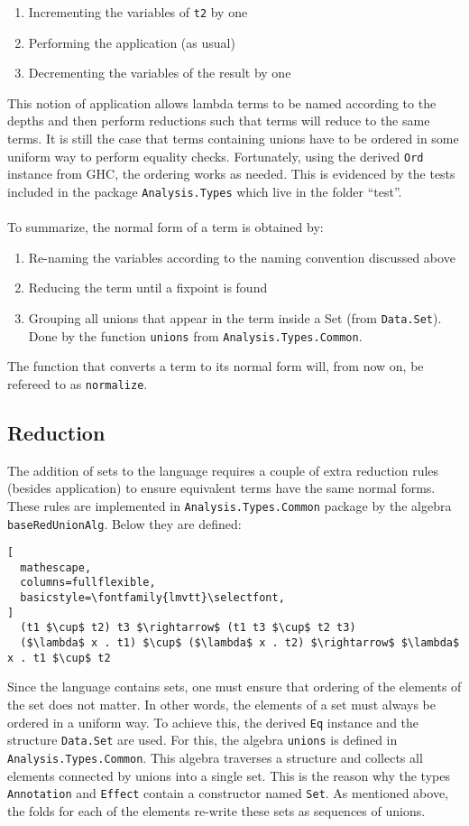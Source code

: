 \documentclass[8pt]{extarticle}
\begin{document}
\begin{enumerate}
\item Incrementing the variables of \verb+t2+ by one
\item Performing the application (as usual)
\item Decrementing the variables of the result by one
\end{enumerate}
This notion of application allows lambda terms to be named according to the depths and then perform reductions such that terms will reduce to the same terms. It is still the case that terms containing unions have to be ordered in some uniform way to perform equality checks. Fortunately, using the derived \verb+Ord+ instance from GHC, the ordering works as needed. This is evidenced by the tests included in the package \verb+Analysis.Types+ which live in the folder ``test''.
\\\\
To summarize, the normal form of a term is obtained by:
\begin{enumerate}
\item Re-naming the variables according to the naming convention discussed above
\item Reducing the term until a fixpoint is found
\item Grouping all unions that appear in the term inside a Set (from \verb+Data.Set+). Done by the function \verb+unions+ from \verb+Analysis.Types.Common+.
\end{enumerate}
The function that converts a term to its normal form will, from now on, be refereed to as \verb+normalize+.
\subsection{Reduction}
The addition of sets to the language requires a couple of extra reduction rules (besides application) to ensure equivalent terms have the same normal forms. These rules are implemented in \verb+Analysis.Types.Common+ package by the algebra \verb+baseRedUnionAlg+. Below they are defined:
\begin{lstlisting}[
  mathescape,
  columns=fullflexible,
  basicstyle=\fontfamily{lmvtt}\selectfont,
]
  (t1 $\cup$ t2) t3 $\rightarrow$ (t1 t3 $\cup$ t2 t3)
  ($\lambda$ x . t1) $\cup$ ($\lambda$ x . t2) $\rightarrow$ $\lambda$ x . t1 $\cup$ t2
\end{lstlisting}
Since the language contains sets, one must ensure that ordering of the elements of the set does not matter. In other words, the elements of a set must always be ordered in a uniform way. To achieve this, the derived \verb+Eq+ instance and the structure \verb+Data.Set+ are used. For this, the algebra \verb+unions+ is defined in \verb+Analysis.Types.Common+. This algebra traverses a structure and collects all elements connected by unions into a single set. This is the reason why the types \verb+Annotation+ and \verb+Effect+ contain a constructor named \verb+Set+. As mentioned above, the folds for each of the elements re-write these sets as sequences of unions.
\end{document}
